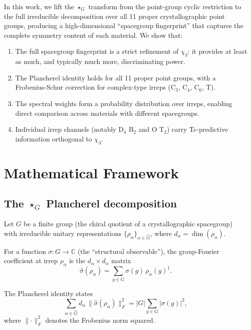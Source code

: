 \documentclass[aps,prb,twocolumn,superscriptaddress]{revtex4-2}
\newcommand{\starG}{\star_G}
\newcommand{\Ghat}{\widehat{G}}
\newcommand{\CC}{\mathbb{C}}
\newcommand{\frobsq}[1]{\lVert #1 \rVert_F^2}
\newcommand{\sighat}{\hat{\sigma}}
\begin{document}
In this work, we lift the $\starG$ transform from the point-group
cyclic restriction to the full irreducible decomposition over all 11
proper crystallographic point groups, producing a high-dimensional
``spacegroup fingerprint'' that captures the complete symmetry content
of each material. We show that:

\begin{enumerate}
  \item The full spacegroup fingerprint is a strict refinement of
    $\chi_3$: it provides at least as much, and typically much more,
    discriminating power.
  \item The Plancherel identity holds for all 11 proper point groups,
    with a Frobenius-Schur correction for complex-type irreps (C$_3$,
    C$_4$, C$_6$, T).
  \item The spectral weights form a probability distribution over
    irreps, enabling direct comparison across materials with different
    spacegroups.
  \item Individual irrep channels (notably D$_4$ B$_2$ and O T$_2$)
    carry Tc-predictive information orthogonal to $\chi_3$.
\end{enumerate}

\section{Mathematical Framework}
\label{sec:math}

\subsection{The $\starG$ Plancherel decomposition}

Let $G$ be a finite group (the chiral quotient of a crystallographic
spacegroup) with irreducible unitary representations
$\{\rho_\alpha\}_{\alpha \in \Ghat}$, where $d_\alpha = \dim(\rho_\alpha)$.

For a function $\sigma : G \to \CC$ (the ``structural observable''),
the group-Fourier coefficient at irrep $\rho_\alpha$ is the
$d_\alpha \times d_\alpha$ matrix
\begin{equation}
  \sighat(\rho_\alpha) = \sum_{g \in G} \sigma(g) \, \rho_\alpha(g)^\dagger.
  \label{eq:fourier-coeff}
\end{equation}

The Plancherel identity states
\begin{equation}
  \sum_{\alpha \in \Ghat} d_\alpha \, \frobsq{\sighat(\rho_\alpha)}
  = |G| \sum_{g \in G} |\sigma(g)|^2,
  \label{eq:plancherel}
\end{equation}
where $\frobsq{\cdot}$ denotes the Frobenius norm squared.
\end{document}
